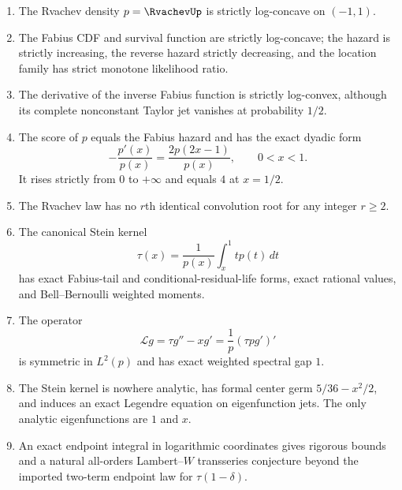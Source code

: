 \documentclass[11pt,oneside]{article}
\theoremstyle{definition}
\theoremstyle{remark}
\begin{document}
\begin{enumerate}[label=\textbf{R\arabic*.},leftmargin=3.2em]
\item The Rvachev density $p=\RvachevUp$ is strictly log-concave on $(-1,1)$.
\item The Fabius CDF and survival function are strictly log-concave; the hazard is strictly increasing, the reverse hazard strictly decreasing, and the location family has strict monotone likelihood ratio.
\item The derivative of the inverse Fabius function is strictly log-convex, although its complete nonconstant Taylor jet vanishes at probability $1/2$.
\item The score of $p$ equals the Fabius hazard and has the exact dyadic form
\[
 -\frac{p'(x)}{p(x)}=\frac{2p(2x-1)}{p(x)},\qquad 0<x<1.
\]
It rises strictly from $0$ to $+\infty$ and equals $4$ at $x=1/2$.
\item The Rvachev law has no $r$th identical convolution root for any integer $r\ge2$.
\item The canonical Stein kernel
\[
 \tau(x)=\frac{1}{p(x)}\int_x^1 t p(t)\,dt
\]
has exact Fabius-tail and conditional-residual-life forms, exact rational values,
and Bell--Bernoulli weighted moments.
\item The operator
\[
 \mathcal L g=\tau g''-xg'=\frac1p(\tau p g')'
\]
is symmetric in $L^2(p)$ and has exact weighted spectral gap $1$.
\item The Stein kernel is nowhere analytic, has formal center germ
$5/36-x^2/2$, and induces an exact Legendre equation on eigenfunction jets.
The only analytic eigenfunctions are $1$ and $x$.
\item An exact endpoint integral in logarithmic coordinates gives rigorous bounds
and a natural all-orders Lambert--$W$ transseries conjecture beyond the imported
two-term endpoint law for $\tau(1-\delta)$.
\end{enumerate}
\end{document}
